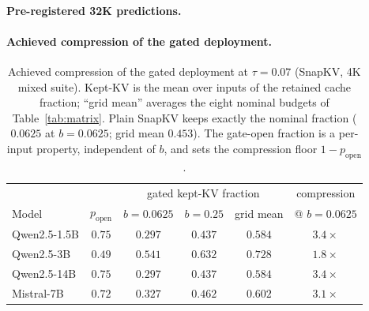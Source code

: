 \documentclass{article}
\begin{document}
\paragraph{Pre-registered 32K predictions.}

\begin{table}[h]
\centering
\caption{Pre-registered 32K predictions vs.\ measurements
(Qwen2.5-1.5B, $N = 100$ per task). Predicted intervals = 4K/16K ratio
band $\times$ measured 32K headroom, frozen before the sweep.}
\label{tab:prereg32k}
\end{table}

\paragraph{Achieved compression of the gated deployment.}

\begin{table}[t]
\centering
\caption{Achieved compression of the gated deployment at $\tau=0.07$ (SnapKV,
4K mixed suite). Kept-KV is the mean over inputs of the retained cache
fraction; ``grid mean'' averages the eight nominal budgets of
Table~\ref{tab:matrix}. Plain SnapKV keeps exactly the nominal fraction
($0.0625$ at $b=0.0625$; grid mean $0.453$). The gate-open fraction is a
per-input property, independent of $b$, and sets the compression floor
$1-p_{\text{open}}$.}
\label{tab:achieved-compression}
\begin{tabular}{lccccc}
\toprule
 & & \multicolumn{3}{c}{gated kept-KV fraction} & compression \\
\cmidrule(lr){3-5}
Model & $p_{\text{open}}$ & $b{=}0.0625$ & $b{=}0.25$ & grid mean & @ $b{=}0.0625$ \\
\midrule
Qwen2.5-1.5B & $0.75$ & $0.297$ & $0.437$ & $0.584$ & $3.4\times$ \\
Qwen2.5-3B   & $0.49$ & $0.541$ & $0.632$ & $0.728$ & $1.8\times$ \\
Qwen2.5-14B  & $0.75$ & $0.297$ & $0.437$ & $0.584$ & $3.4\times$ \\
Mistral-7B   & $0.72$ & $0.327$ & $0.462$ & $0.602$ & $3.1\times$ \\
\bottomrule
\end{tabular}
\end{table}
\end{document}
